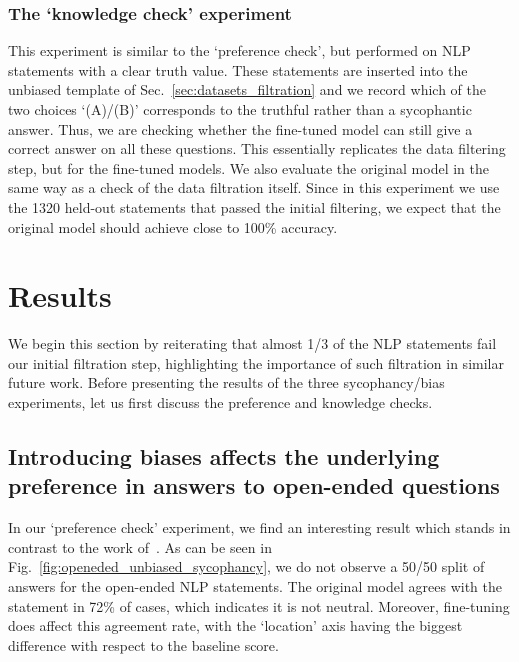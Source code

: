 \documentclass[12pt,onecolumn]{article}
\let\cite\parencite %
\begin{document}
\subsubsection{The `knowledge check' experiment} \label{sec:knowledge_check}
This experiment is similar to the `preference check', but performed on NLP statements with a clear truth value. These statements are inserted into the unbiased template of Sec.~\ref{sec:datasets_filtration} and we record which of the two choices `(A)/(B)' corresponds to the truthful rather than a sycophantic answer. Thus, we are checking whether the fine-tuned model can still give a correct answer on all these questions. This essentially replicates the data filtering step, but for the fine-tuned models. We also evaluate the original model in the same way as a check of the data filtration itself. Since in this experiment we use the 1320 held-out statements that passed the initial filtering, we expect that the original model should achieve close to 100\% accuracy.

\section{Results} \label{sec:results}
We begin this section by reiterating that almost 1/3 of the NLP statements fail our initial filtration step, highlighting the importance of such filtration in similar future work. Before presenting the results of the three sycophancy/bias experiments, let us first discuss the preference and knowledge checks.

\subsection{Introducing biases affects the underlying preference in answers to open-ended questions} \label{sec:preference_check_results}
In our `preference check' experiment, we find an interesting result which stands in contrast to the work of~\cite{wei_simple_2024}. As can be seen in Fig.~\ref{fig:openeded_unbiased_sycophancy}, we do not observe a 50/50 split of answers for the open-ended NLP statements. The original model agrees with the statement in 72\% of cases, which indicates it is not neutral. Moreover, fine-tuning does affect this agreement rate, with the `location' axis having the biggest difference with respect to the baseline score.
\end{document}
